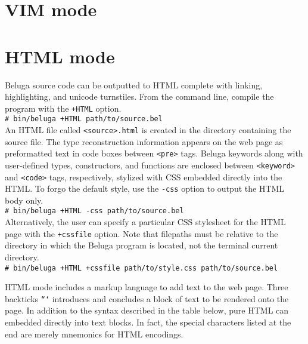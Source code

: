 \documentclass[11pt]{article}
\newcommand{\shellcmd}[1]{\\\indent\texttt{\# #1}\\}
\begin{document}
\section{VIM mode}

\section{HTML mode}
Beluga source code can be outputted to HTML complete with linking, highlighting, and unicode turnstiles. From the command line, compile the program with the \texttt{+HTML} option.
\shellcmd{bin/beluga +HTML path/to/source.bel}
An HTML file called \texttt{<source>.html} is created in the directory containing the source file. The type reconstruction information appears on the web page as preformatted text in code boxes between \texttt{<pre>} tags. Beluga keywords along with user-defined types, constructors, and functions are enclosed between \texttt{<keyword>} and \texttt{<code>} tags, respectively, stylized with CSS embedded directly into the HTML. To forgo the default style, use the \texttt{-css} option to output the HTML body only.
\shellcmd{bin/beluga +HTML -css path/to/source.bel}
Alternatively, the user can specify a particular CSS stylesheet for the HTML page with the \texttt{+cssfile} option. Note that filepaths must be relative to the directory in which the Beluga program is located, not the terminal current directory.  
\shellcmd{bin/beluga +HTML +cssfile path/to/style.css path/to/source.bel}

\newpage

HTML mode includes a markup language to add text to the web page. Three backticks \texttt{```} introduces and concludes a block of text to be rendered onto the page. In addition to the syntax described in the table below, pure HTML can embedded directly into text blocks. In fact, the special characters listed at the end are merely mnemonics for HTML encodings. \\
\end{document}
